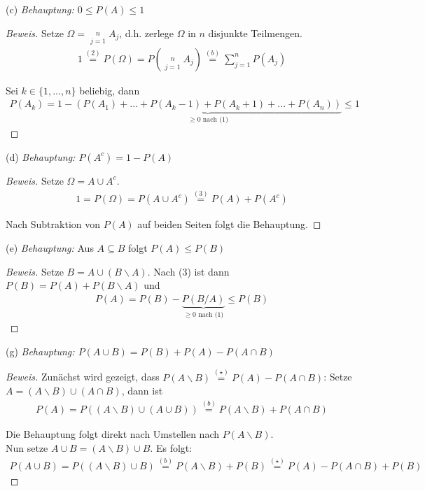 \documentclass[10pt]{article}
\begin{document}
(c) \textit{Behauptung: $0 \leq P(A) \leq 1$}
\begin{proof}[Beweis]
Setze $\Omega = \mathop{\dot\bigcup}\limits_{j=1}^{n} A_j$, d.h. zerlege $\Omega$ in $n$ disjunkte Teilmengen. 
\begin{align*}
    1 \stackrel{(2)}{=} P(\Omega) = P\left( \mathop{\dot\bigcup}\limits_{j=1}^{n} A_j \right) \stackrel{(b)}{=} \sum\limits_{j=1}^{n} P(A_j)
\end{align*}

Sei $k\in\{1,...,n\}$ beliebig, dann
\begin{align*}
    P(A_k) = 1 - \underbrace{(P(A_1) +...+ P(A_k-1) + P(A_k+1) +...+ P(A_n))}_\text{$\geq 0$ nach (1)} \leq 1
\end{align*}

\end{proof}

(d) \textit{Behauptung: $P(A^c) = 1 - P(A)$}
\begin{proof}[Beweis]
Setze $\Omega = A \cup A^c$. 
\begin{align*}
    1 = P(\Omega) = P(A \cup A^c) \stackrel{(3)}{=} P(A) + P(A^c)
\end{align*}

Nach Subtraktion von $P(A)$ auf beiden Seiten folgt die Behauptung.

\end{proof}

(e) \textit{Behauptung: } Aus $A \subseteq B$ folgt $P(A) \leq P(B)$
\begin{proof}[Beweis]
Setze $B = A \cup (B\backslash A)$. Nach (3) ist dann $P(B) = P(A) + P(B\backslash A)$ und 
\begin{align*}
    P(A) = P(B) - \underbrace{P(B/A)}_\text{$\geq 0$ nach (1)} \leq P(B)
\end{align*}

\end{proof}

(g) \textit{Behauptung: $P(A \cup B) = P(B) + P(A) - P(A \cap B)$}
\begin{proof}[Beweis]
Zunächst wird gezeigt, dass $P(A\backslash B) \stackrel{(\star)}{=} P(A) - P(A \cap B)$: Setze $A = (A\backslash B) \cup (A \cap B)$, dann ist 
\begin{align*}
    P(A) = P((A\backslash B)\cup(A \cup B)) \stackrel{(b)}{=} P(A\backslash B) + P(A\cap B)
\end{align*}

Die Behauptung folgt direkt nach Umstellen nach $P(A\backslash B)$. \\
Nun setze $A\cup B = (A\backslash B) \cup B$. Es folgt: 
\begin{align*}
    P(A \cup B) = P((A\backslash B) \cup B) \stackrel{(b)}{=} P(A\backslash B) + P(B) \stackrel{(\star)}{=} P(A) - P(A \cap B) + P(B)
\end{align*}

\end{proof}
\end{document}
